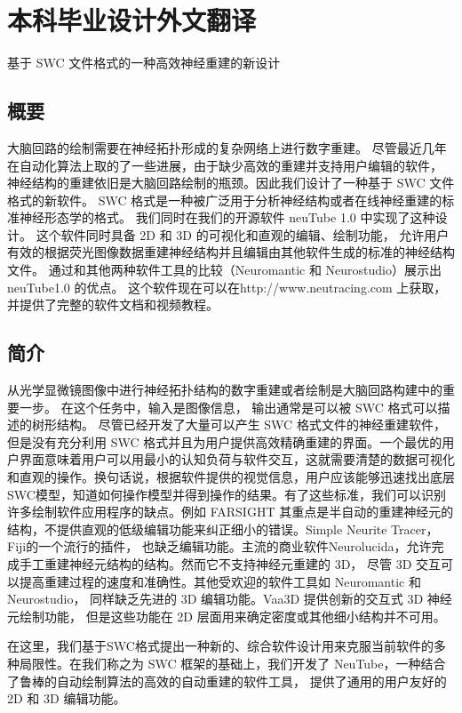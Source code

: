 \thispagestyle{empty}
{
\chapter{本科毕业设计外文翻译}

基于 SWC 文件格式的一种高效神经重建的新设计

\section{概要}

大脑回路的绘制需要在神经拓扑形成的复杂网络上进行数字重建。 尽管最近几年在自动化算法上取的了一些进展，由于缺少高效的重建并支持用户编辑的软件， 神经结构的重建依旧是大脑回路绘制的瓶颈。因此我们设计了一种基于 SWC 文件格式的新软件。 SWC 格式是一种被广泛用于分析神经结构或者在线神经重建的标准神经形态学的格式。 我们同时在我们的开源软件 neuTube 1.0 中实现了这种设计。 这个软件同时具备 2D 和 3D 的可视化和直观的编辑、绘制功能， 允许用户有效的根据荧光图像数据重建神经结构并且编辑由其他软件生成的标准的神经结构文件。 通过和其他两种软件工具的比较（Neuromantic 和 Neurostudio）展示出 neuTube1.0 的优点。 这个软件现在可以在http://www.neutracing.com 上获取， 并提供了完整的软件文档和视频教程。

\section{简介}
从光学显微镜图像中进行神经拓扑结构的数字重建或者绘制是大脑回路构建中的重要一步。 在这个任务中，输入是图像信息， 输出通常是可以被 SWC 格式可以描述的树形结构。 尽管已经开发了大量可以产生 SWC 格式文件的神经重建软件，但是没有充分利用 SWC 格式并且为用户提供高效精确重建的界面。一个最优的用户界面意味着用户可以用最小的认知负荷与软件交互，这就需要清楚的数据可视化和直观的操作。换句话说，根据软件提供的视觉信息，用户应该能够迅速找出底层SWC模型，知道如何操作模型并得到操作的结果。有了这些标准，我们可以识别许多绘制软件应用程序的缺点。例如 FARSIGHT 其重点是半自动的重建神经元的结构，不提供直观的低级编辑功能来纠正细小的错误。Simple Neurite Tracer，Fiji的一个流行的插件， 也缺乏编辑功能。主流的商业软件Neurolucida，允许完成手工重建神经元结构的结构。然而它不支持神经元重建的 3D， 尽管 3D 交互可以提高重建过程的速度和准确性。其他受欢迎的软件工具如 Neuromantic 和 Neurostudio， 同样缺乏先进的 3D 编辑功能。Vaa3D 提供创新的交互式 3D 神经元绘制功能， 但是这些功能在 2D 层面用来确定密度或其他细小结构并不可用。

在这里，我们基于SWC格式提出一种新的、综合软件设计用来克服当前软件的多种局限性。在我们称之为 SWC 框架的基础上，我们开发了 NeuTube，一种结合了鲁棒的自动绘制算法的高效的自动重建的软件工具， 提供了通用的用户友好的 2D 和 3D 编辑功能。

}
